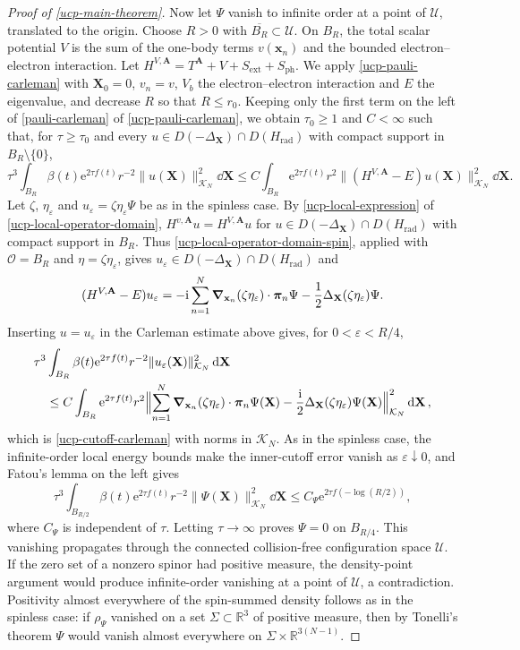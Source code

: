 \documentclass[final,reqno]{amsart}
\theoremstyle{remark}
\newcommand{\RR}{\mathbb{R}}
\renewcommand{\i}{\mathrm{i}}
\newcommand{\e}{\mathrm{e}}
\newcommand{\ol}[1]{\overline{#1}}
\newcommand{\DC}{D}
\newcommand{\rad}{\mathrm{rad}}
\newcommand{\vpi}{{\bm{\pi}}}
\newcommand{\vx}{\mathbf{x}}
\newcommand{\vA}{{\mathbf{A}}}
\newcommand{\vX}{{\mathbf{X}}}
\renewcommand{\epsilon}{\varepsilon}
\begin{document}
\begin{proof}[Proof of \cref{ucp-main-theorem}]
Now let $\Psi$ vanish to infinite order at a point of $\mathcal U$,
translated to the origin.  Choose $R>0$ with
$\ol{B_R}\subset\mathcal U$.  On $B_R$, the total scalar potential $V$
is the sum of the one-body terms $v(\vx_n)$ and the bounded
electron--electron interaction.  Let
$H^{V,\vA}=T^{\vA}+V+S_{\mathrm{ext}}+S_{\mathrm{ph}}$.  We apply
\cref{ucp-pauli-carleman} with $\vX_0=0$, $v_n=v$, $V_b$ the
electron--electron interaction and $E$ the eigenvalue, and decrease
$R$ so that $R\leq r_0$.  Keeping only the first term on the left of
\cref{pauli-carleman} of \cref{ucp-pauli-carleman}, we obtain $\tau_0\geq1$ and $C<\infty$ such
that, for $\tau\geq\tau_0$ and every
$u\in\DC(-\Delta_{\vX})\cap\DC(H_\rad)$ with compact support in
$B_R\setminus\{0\}$,
\[
 \tau^3\int_{B_R}\beta(t)\e^{2\tau f(t)}r^{-2}
        \|u(\vX)\|_{\mathcal K_N}^2\dd\vX
 \leq C\int_{B_R}\e^{2\tau f(t)}r^2
   \|(H^{V,\vA}-E)u(\vX)\|_{\mathcal K_N}^2\dd\vX.
\]
Let $\zeta$, $\eta_\epsilon$ and $u_\epsilon=\zeta\eta_\epsilon\Psi$ be
as in the spinless case.  By \cref{ucp-local-expression} of \cref{ucp-local-operator-domain},
$H^{v,\vA}u=H^{V,\vA}u$ for $u\in\DC(-\Delta_{\vX})\cap\DC(H_\rad)$
with compact support in $B_R$.  Thus
\cref{ucp-local-operator-domain-spin}, applied with $\mathcal O=B_R$
and $\eta=\zeta\eta_\epsilon$, gives
$u_\epsilon\in\DC(-\Delta_{\vX})\cap\DC(H_\rad)$ and
\[
 (H^{V,\vA}-E)u_\epsilon
 =-\i\sum_{n=1}^N\grad_{\vx_n}(\zeta\eta_\epsilon)\cdot\vpi_n\Psi
  -\frac12\Delta_{\vX}(\zeta\eta_\epsilon)\Psi.
\]
Inserting $u=u_\epsilon$ in the Carleman estimate above gives, for
$0<\epsilon<R/4$,
\[
 \begin{split}
 &\tau^3\int_{B_R}\beta(t)\e^{2\tau f(t)}r^{-2}
        \|u_\epsilon(\vX)\|_{\mathcal K_N}^2\dd\vX\\
 &\quad\leq C\int_{B_R}\e^{2\tau f(t)}r^2
   \Bigl\|\sum_{n=1}^N\grad_{\vx_n}(\zeta\eta_\epsilon)\cdot\vpi_n\Psi(\vX)
     -\frac{\i}{2}\Delta_{\vX}(\zeta\eta_\epsilon)\Psi(\vX)\Bigr\|_{\mathcal K_N}^2\dd\vX,
 \end{split}
\]
which is \cref{ucp-cutoff-carleman} with norms in $\mathcal K_N$.  As
in the spinless case, the infinite-order local energy bounds make the
inner-cutoff error vanish as $\epsilon\downarrow0$, and Fatou's lemma
on the left gives
\[
 \tau^3\int_{B_{R/2}}\beta(t)\e^{2\tau f(t)}r^{-2}
                         \|\Psi(\vX)\|_{\mathcal K_N}^2\dd\vX
 \leq C_\Psi \e^{2\tau f(-\log(R/2))},
\]
where $C_\Psi$ is independent of $\tau$.  Letting $\tau\to\infty$
proves $\Psi=0$ on $B_{R/4}$.  This vanishing propagates
through the connected collision-free configuration space $\mathcal U$.
If the zero set of a nonzero spinor had positive measure, the
density-point argument would produce infinite-order vanishing at
a point of $\mathcal U$, a contradiction.  Positivity almost everywhere
of the spin-summed density follows as in the spinless case: if
$\rho_\Psi$ vanished on a set $\Sigma\subset\RR^3$ of positive measure, then by
Tonelli's theorem $\Psi$ would vanish almost everywhere on
$\Sigma\times\RR^{3(N-1)}$.
\end{proof}
\end{document}
